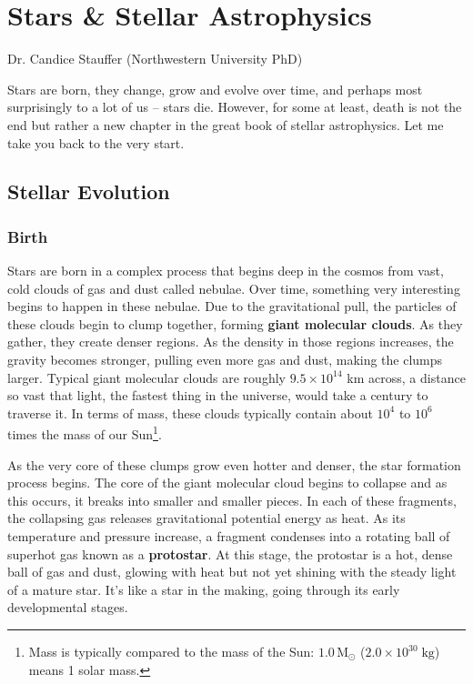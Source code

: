 \section{Stars \& Stellar Astrophysics}

\begin{sectionauthor}
   Dr. Candice Stauffer (Northwestern University PhD) 
\end{sectionauthor}
\vspace{20pt}

Stars are born, they change, grow and evolve over time, and perhaps most surprisingly to a lot of us -- stars die.
However, for some at least, death is not the end but rather a new chapter in the great book of stellar astrophysics. 
Let me take you back to the very start.


\subsection{Stellar Evolution}
 
\subsubsection{Birth}

Stars are born in a complex process that begins deep in the cosmos from vast, cold clouds of gas and dust called nebulae. Over time, something very interesting begins to happen in these nebulae. Due to the gravitational pull, the particles of these clouds begin to clump together, forming \textbf{giant molecular clouds}. As they gather, they create denser regions. As the density in those regions increases, the gravity becomes stronger, pulling even more gas and dust, making the clumps larger. Typical giant molecular clouds are roughly \(9.5 \times 10^{14}\) km across, a distance so vast that light, the fastest thing in the universe, would take a century to traverse it. In terms of mass, these clouds typically contain about \(10^4\) to \(10^6\) times the mass of our Sun\footnote{Mass is typically compared to the mass of the Sun: $1.0\,\mathrm{M_{\odot}}$ ($2.0\times 10^{30}\;\mathrm{kg}$) means 1 solar mass.}.


As the very core of these clumps grow even hotter and denser, the star formation process begins. The core of the giant molecular cloud begins to collapse and as this occurs, it breaks into smaller and smaller pieces. In each of these fragments, the collapsing gas releases gravitational potential energy as heat. As its temperature and pressure increase, a fragment condenses into a rotating ball of superhot gas known as a \textbf{protostar}. At this stage, the protostar is a hot, dense ball of gas and dust, glowing with heat but not yet shining with the steady light of a mature star. It's like a star in the making, going through its early developmental stages.

